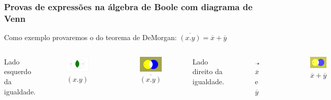 \begin{frame}
	\frametitle{Provas de expressões na álgebra de Boole com diagrama de Venn }
	\par Como exemplo provaremos o do teorema de DeMorgan: $\overline{(x . y)} = \overline{x}+\overline{y}$
	\begin{columns}
		\par Lado esquerdo da igualdade.	
		\begin{figure}
			\centering
			\includegraphics[width=0.4\linewidth]{images/x.y}
			\caption{$(x . y)$}
			\label{fig:x}
		\end{figure}
		\begin{figure}
			\centering
			\includegraphics[width=0.4\linewidth]{images/notX.Y}
			\caption{$\overline{(x . y)}$}
			\label{fig:notx}
		\end{figure}
		\par Lado direito da igualdade.
		\begin{figure}
			\centering
			\includegraphics[width=.9\linewidth]{images/notXNotY}
			\caption{$\overline{x}$ e $\overline{y}$}
			\label{fig:notxnoty}
		\end{figure}
		\begin{figure}
			\centering
			\includegraphics[width=0.4\linewidth]{images/notX+notY-4}
			\caption{$\overline{x}+\overline{y}$}
			\label{fig:notxnoty-4}
		\end{figure}
	\end{columns}
\end{frame}

